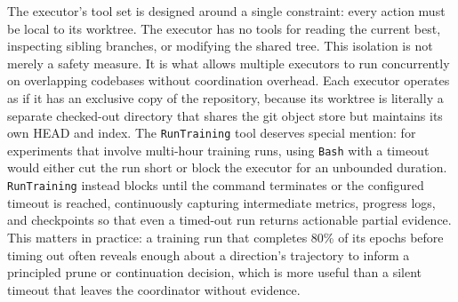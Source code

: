 The executor's tool set is designed around a single constraint: every action
must be local to its worktree. The executor has no tools for reading the
current best, inspecting sibling branches, or modifying the shared tree. This
isolation is not merely a safety measure. It is what allows multiple
executors to run concurrently on overlapping codebases without coordination
overhead. Each executor operates as if it has an exclusive copy of the
repository, because its worktree is literally a separate checked-out
directory that shares the git object store but maintains its own HEAD and
index. The \texttt{RunTraining} tool deserves special mention: for experiments
that involve multi-hour training runs, using \texttt{Bash} with a timeout
would either cut the run short or block the executor for an unbounded
duration. \texttt{RunTraining} instead blocks until the command terminates
or the configured timeout is reached, continuously capturing intermediate
metrics, progress logs, and checkpoints so that even a timed-out run
returns actionable partial evidence. This matters in practice: a training
run that completes 80\% of its epochs before timing out often reveals enough
about a direction's trajectory to inform a principled prune or continuation
decision, which is more useful than a silent timeout that leaves the
coordinator without evidence.

